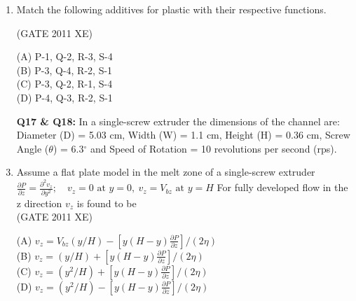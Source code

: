 \documentclass[journal,12pt,onecolumn]{IEEEtran}
\begin{document}
\begin{enumerate}[label=\arabic*)]
\hfill{(GATE 2011 XE)} \\
\begin{multicols}{2}
(A) $\mu_{upper}$ and $\mu_{lower}$ versus shear rate are connected by discontinuous curve\\
(B) $\mu_{upper} > \mu_{lower}$\\
(C) $\mu_{upper} < \mu_{lower}$\\
(D) $\mu_{upper} = \mu_{lower}$
\end{multicols}

\newpage

\item Match the following additives for plastic with their respective functions.



\hfill{(GATE 2011 XE)} \\
\begin{multicols}{2}

(A) P-1, Q-2, R-3, S-4\\
(B) P-3, Q-4, R-2, S-1\\
(C) P-3, Q-2, R-1, S-4\\
(D) P-4, Q-3, R-2, S-1
\end{multicols}


\item[\textbf{Q17 \& Q18:}] In a single-screw extruder the dimensions of the channel are: Diameter (D) = 5.03 cm, Width (W) = 1.1 cm, Height (H) = 0.36 cm, Screw Angle ($\theta$) = 6.3$^\circ$ and Speed of Rotation = 10 revolutions per second (rps).\\

\item Assume a flat plate model in the melt zone of a single-screw extruder
$
\frac{\partial P}{\partial z} = \frac{\partial^2 v_z}{\partial y^2};\quad v_z = 0 \text{ at } y=0, \ v_z = V_{bz} \text{ at } y=H$
For fully developed flow in the z direction $v_z$ is found to be\\

\hfill{(GATE 2011 XE)} \\
\begin{multicols}{2}
(A) $v_z = V_{bz}(y/H) - [y(H-y) \frac{\partial P}{\partial z}]/(2\eta)$\\
(B) $v_z = (y/H) + [y(H-y) \frac{\partial P}{\partial z}]/(2\eta)$\\
(C) $v_z = (y^2/H) + [y(H-y) \frac{\partial P}{\partial z}]/(2\eta)$\\
(D) $v_z = (y^2/H) - [y(H-y) \frac{\partial P}{\partial z}]/(2\eta)$
\end{multicols}


\end{enumerate}
\end{document}
